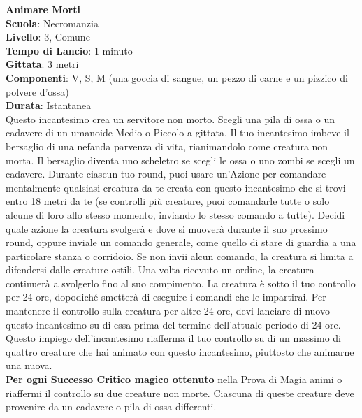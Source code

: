 \begin{multicols}{2}
\medskip\textbf{Animare Morti}\\
\textbf{Scuola}: Necromanzia\\
\textbf{Livello}: 3, Comune\\
\textbf{Tempo di Lancio}: 1 minuto\\
\textbf{Gittata}: 3 metri\\
\textbf{Componenti}: V, S, M (una goccia di sangue, un pezzo di carne e un pizzico di polvere d'ossa)\\
\textbf{Durata}: Istantanea\\
Questo incantesimo crea un servitore non morto. Scegli una pila di ossa o un cadavere di un umanoide Medio o Piccolo a gittata. Il tuo incantesimo imbeve il bersaglio di una nefanda parvenza di vita, rianimandolo come creatura non morta. Il bersaglio diventa uno scheletro se scegli le ossa o uno zombi se scegli un cadavere. Durante ciascun tuo round, puoi usare un'Azione per comandare mentalmente qualsiasi creatura da te creata con questo incantesimo che si trovi entro 18 metri da te (se controlli più creature, puoi comandarle tutte o solo alcune di loro allo stesso momento, inviando lo stesso comando a tutte). Decidi quale azione la creatura svolgerà e dove si muoverà durante il suo prossimo round, oppure inviale un comando generale, come quello di stare di guardia a una particolare stanza o corridoio. Se non invii alcun comando, la creatura si limita a difendersi dalle creature ostili. Una volta ricevuto un ordine, la creatura continuerà a svolgerlo fino al suo compimento. La creatura è sotto il tuo controllo per 24 ore, dopodiché smetterà di eseguire i comandi che le impartirai. Per mantenere il controllo sulla creatura per altre 24 ore, devi lanciare di nuovo questo incantesimo su di essa prima del termine dell'attuale periodo di 24 ore. Questo impiego dell'incantesimo riafferma il tuo controllo su di un massimo di quattro creature che hai animato con questo incantesimo, piuttosto che animarne una nuova.\\
\textbf{Per ogni Successo Critico magico ottenuto} nella Prova di Magia animi o riaffermi il controllo su due creature non morte. Ciascuna di queste creature deve provenire da un cadavere o pila di ossa differenti.


\end{multicols}
